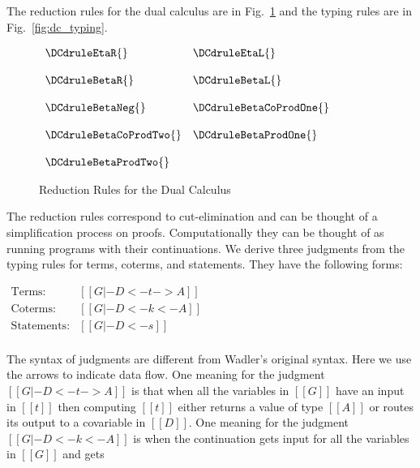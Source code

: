The reduction rules for the dual calculus are in Fig.~\ref{fig:dc_red}
and the typing rules are in Fig.~\ref{fig:dc_typing}.  
\begin{figure}
  \begin{center}
    \begin{math}
      \begin{array}{lll}
        \DCdruleEtaR{} & \DCdruleEtaL{}\\
        &\\
        \DCdruleBetaR{} & \DCdruleBetaL{}\\
        &\\
        \DCdruleBetaNeg{} & \DCdruleBetaCoProdOne{}\\
        &\\
        \DCdruleBetaCoProdTwo{} & \DCdruleBetaProdOne{}\\
        &\\
        \DCdruleBetaProdTwo{}
      \end{array}
    \end{math}
  \end{center}
  \caption{Reduction Rules for the Dual Calculus}
  \label{fig:dc_red}
\end{figure}
The reduction rules correspond to cut-elimination and can be thought
of a simplification process on proofs.  Computationally they can be
thought of as running programs with their continuations.  We derive
three judgments from the typing rules for terms, coterms, and
statements.  They have the following forms:
\begin{center}
  \begin{math}
    \begin{array}{lll}
      \text{Terms}:      & [[G |- D <- t -> A]]\\
      \text{Coterms}:    & [[G |- D <- k <- A]]\\
      \text{Statements}: & [[G |- D <- s]]\\
    \end{array}
  \end{math}
\end{center}
The syntax of judgments are different from Wadler's original syntax.
Here we use the arrows to indicate data flow.  One meaning for the
judgment $[[G |- D <- t -> A]]$ is that when all the variables in
$[[G]]$ have an input in $[[t]]$ then computing $[[t]]$ either returns
a value of type $[[A]]$ or routes its output to a covariable in
$[[D]]$.  One meaning for the judgment $[[G |- D <- k <- A]]$ is when
the continuation gets input for all the variables in $[[G]]$ and gets
